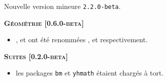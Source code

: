 Nouvelle version mineure \verb+2.2.0-beta+.




\begin{center}
    \textbf{\textsc{Géométrie [0.6.0-beta]}}
\end{center}

\begin{itemize}[itemsep=.5em]
    \item {}
          ,
          et
          ont été renommées
          ,
          et
          respectivement.


\end{itemize}


\separation




\begin{center}
    \textbf{\textsc{Suites [0.2.0-beta]}}
\end{center}

\begin{itemize}[itemsep=.5em]
    \item {}
          les packages \verb#bm# et \verb#yhmath# étaient chargés à tort.   
\end{itemize}


\separation
